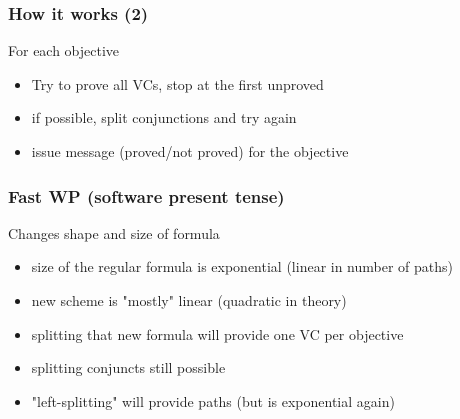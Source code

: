 \documentclass{beamer}
\newenvironment{specialframe}{%
  \begin{frame}[fragile,environment=specialframe]}{\end{frame}}
\begin{document}
\begin{specialframe}\frametitle{How it works (2)}

   \begin{block}{For each objective}
      \begin{itemize}
         \item Try to prove all VCs, stop at the first unproved
         \item if possible, split conjunctions and try again
         \item issue message (proved/not proved) for the objective
      \end{itemize}
   \end{block}

\end{specialframe}

\begin{specialframe}\frametitle{Fast WP (software present tense)}

   \begin{block}{Changes shape and size of formula}
      \begin{itemize}
      \item size of the regular formula is exponential (linear in number of paths)
      \item new scheme is "mostly" linear (quadratic in theory)
      \item splitting that new formula will provide one VC per objective
      \item splitting conjuncts still possible
      \item "left-splitting" will provide paths (but is exponential again)
      \end{itemize}
   \end{block}

\end{specialframe}
\end{document}

